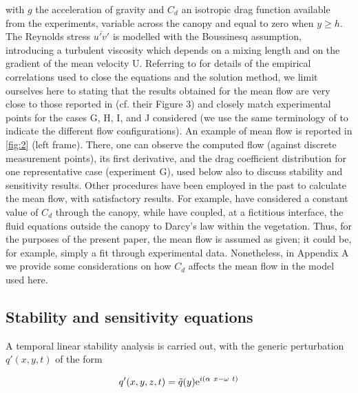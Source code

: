 with $g$ the acceleration of gravity and $C_d$ an isotropic drag function available from the experiments,
variable across the canopy and equal to zero when $y \geq h$. The Reynolds stress $\overline{u'v'}$ is modelled with
the Boussinesq assumption, introducing a turbulent viscosity which depends on a mixing length and
on the gradient of the mean velocity U. Referring to \cite{ghisalberti2004limited} for details of the empirical
correlations used to close the equations and the solution method, we limit ourselves here to stating
that the results obtained for the mean flow are very close to those reported in \cite{zampogna2016instability} (cf.
their Figure 3) and closely match experimental points for the cases G, H, I, and J considered (we use
the same terminology of\cite{ghisalberti2002mixing} \cite{ghisalberti2004limited} \cite{ghisalberti2005mass} to indicate the different flow configurations). An
example of mean flow is reported in \ref{fig:2} (left frame). There, one can observe the computed flow
(against discrete measurement points), its first derivative, and the drag coefficient distribution for one
representative case (experiment G), used below also to discuss stability and sensitivity results.
Other procedures have been employed in the past to calculate the mean flow, with satisfactory
results. For example,\cite{singh2016linear} have considered a constant value of $C_d$ through the canopy, while
\cite{zampogna2016instability} have coupled, at a fictitious interface, the fluid equations outside the canopy
to Darcy’s law within the vegetation. Thus, for the purposes of the present paper, the mean flow is
assumed as given; it could be, for example, simply a fit through experimental data. Nonetheless, in
Appendix A we provide some considerations on how $C_d$ affects the mean flow in the model used here.


\subsection{Stability and sensitivity equations}
\label{sec2b}
A temporal linear stability analysis is carried out, with the generic perturbation $q'(x, y,t)$ of the
form

\begin{equation}
q'(x,y,z,t)=\tilde q(y){\rm e}^{i(\alpha \  x -\omega \ t)}
\label{eq:q}
\end{equation}

